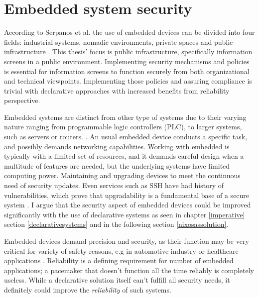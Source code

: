 \chapter{Embedded system security} \label{embedded}

According to Serpanos et al. the use of embedded devices can be
divided into four fields: industrial systems, nomadic environments,
private spaces and public infrastructure
\cite{serpanos2013security}. This thesis' focus is public
infrastructure, specifically information screens in a public
environment. Implementing security mechanisms and policies is
essential for information screens to function securely from both
organizational and technical viewpoints. Implementing those policies
and assuring compliance is trivial with declarative approaches with
increased benefits from reliability perspective.

Embedded systems are distinct from other type of systems due to their
varying nature ranging from programmable logic controllers (PLC), to
larger systems, such as servers or
routers. \cite{fysarakis2014embedded}. An usual embedded device
conducts a specific task, and possibly demands networking
capabilities. Working with embedded is typically with a limited set of
resources, and it demands careful design when a multitude of features
are needed, but the underlying systems have limited computing
power. Maintaining and upgrading devices to meet the continuous need
of security updates. Even services such as SSH have had history of
vulnerabilities, which prove that upgradability is a fundamental base
of a secure system \cite{secopsolutionHistorySecOps}. I argue that the
security aspect of embedded devices could be improved significantly
with the use of declarative systems as seen in chapter
\ref{imperative} section \ref{declarativesystems} and in the following
section \ref{nixosassolution}.

Embedded devices demand precision and security, as their function may
be very critical for variety of safety reasons, e.g in automotive
industry or healthcare applications \cite{turab2019secure, fysarakis2014embedded}. Reliability is a defining requirement
for number of embedded applications; a pacemaker that doesn't function
all the time reliably is completely useless. While a declarative
solution itself can't fulfill all security needs, it definitely could
improve the \textit{reliability} of such systems.

